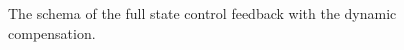 \begin{figure}[]
		\centering
	\DIFdelbeginFL %
	\DIFdelendFL %
		\DIFaddbeginFL \def\svgwidth{1\columnwidth}
		\begin{footnotesize}
			
		\end{footnotesize}
		\DIFaddendFL \caption{The schema of the full state control feedback with the dynamic compensation.}
		\DIFdelbeginFL %
	\DIFdelendFL \DIFaddbeginFL \label{fig:fullstate}
	\DIFaddendFL \end{figure}
%
%
%

